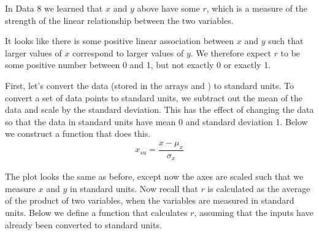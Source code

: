 \documentclass[letterpaper,10pt,english]{jupyterBook}
\begin{document}
\sphinxAtStartPar
{}

\sphinxAtStartPar
In Data 8 we learned that \(x\) and \(y\) above have some  \(r\), which is a measure of the strength of the linear relationship between the two variables.

\sphinxAtStartPar
It looks like there is some positive linear association between \(x\) and \(y\) such that larger values of \(x\) correspond to larger values of \(y\). We therefore expect \(r\) to be some positive number between 0 and 1, but not exactly 0 or exactly 1.

\sphinxAtStartPar
First, let’s convert the data (stored in the arrays  and ) to standard units. To convert a set of data points to standard units, we subtract out the mean of the data and scale by the standard deviation. This has the effect of changing the data so that the data in standard units have mean 0 and  standard deviation 1. Below we construct a function that does this.
\begin{equation*}
\begin{split}
x_{su} = \dfrac{x - \mu_x}{\sigma_x}
\end{split}
\end{equation*}
\begin{sphinxVerbatim}[commandchars=\\\{\}]
 
         
\end{sphinxVerbatim}

\begin{sphinxVerbatim}[commandchars=\\\{\}]
  
  
\end{sphinxVerbatim}

\noindent{}

\sphinxAtStartPar
The plot looks the same as before, except now the axes are scaled such that we measure \(x\) and \(y\) in standard units. Now recall that \(r\) is calculated as the average of the product of two variables, when the variables are measured in standard units. Below we define a function that calculates \(r\), assuming that the inputs have already been converted to standard units.
\end{document}
